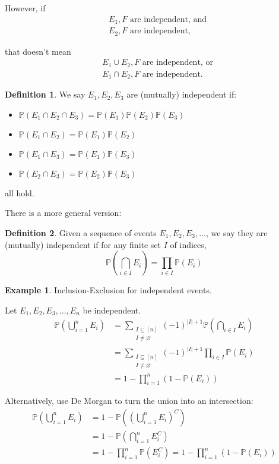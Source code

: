 \documentclass[a4paper,11pt]{amsbook}
\theoremstyle{definition}
\newtheorem{definition}{\hspace{-2em} \color{darkblue} Definition}[chapter]
\newtheorem{example}{\hspace{-2em} \color{darkblue} Example}[chapter]
\theoremstyle{remark}
\renewcommand{\P}{\mathbb{P}}
\newcommand\inc\subseteq
\newcommand\0{\varnothing}
\begin{document}
    However, if \begin{align*}
            &E_1,F\text{ are independent, and} \\
            &E_2,F\text{ are independent,} 
    \end{align*}

    that doesn't mean \begin{align*}
        &E_1\cup E_2,F\text{ are independent, or} \\
        &E_1\cap E_2,F\text{ are independent.} 
    \end{align*}

    \begin{definition}
        We say $E_1,E_2,E_3$ are (mutually) independent if:
        \begin{itemize}
            \item $\P(E_1\cap E_2\cap E_3)=\P(E_1)\P(E_2)\P(E_3)$
            \item $\P(E_1\cap E_2)=\P(E_1)\P(E_2)$
            \item $\P(E_1\cap E_3)=\P(E_1)\P(E_3)$
            \item $\P(E_2\cap E_3)=\P(E_2)\P(E_3)$
        \end{itemize}
        all hold.
    \end{definition}

    There is a more general version:
    \begin{definition}
        Given a sequence of events $E_1,E_2,E_3,\ldots$, we say they are (mutually) independent if 
        for any finite set $I$ of indices, $$\P\left(\bigcap_{i\in I}E_i\right)=\prod_{i\in I}\P(E_i)$$
    \end{definition}

    \begin{example}
        Inclusion-Exclusion for independent events.

        Let $E_1,E_2,E_3,\ldots,E_n$ be independent.
        \begin{align*}
            \P\left(\bigcup_{i=1}^n E_i\right)&=\sum_{\substack{I\inc[n] \\ I\neq\0}}(-1)^{|I|+1}\P\left(\bigcap_{i\in I}E_i\right) \\
            &=\sum_{\substack{I\inc[n] \\ I\neq\0}}(-1)^{|I|+1}\prod_{i\in I}\P(E_i) \\
            &=1-\prod_{i=1}^n(1-\P(E_i))
        \end{align*}

        Alternatively, use De Morgan to turn the union into an intersection:
        \begin{align*}
            \P\left(\bigcup_{i=1}^n E_i\right)&=1-\P\left(\left(\bigcup_{i=1}^n E_i\right)^C\right) \\
            &=1-\P\left(\bigcap_{i=1}^n E_i^C\right) \\
            &=1-\prod_{i=1}^n\P(E_i^C)=1-\prod_{i=1}^n(1-\P(E_i))
        \end{align*}
    \end{example}
\end{document}
